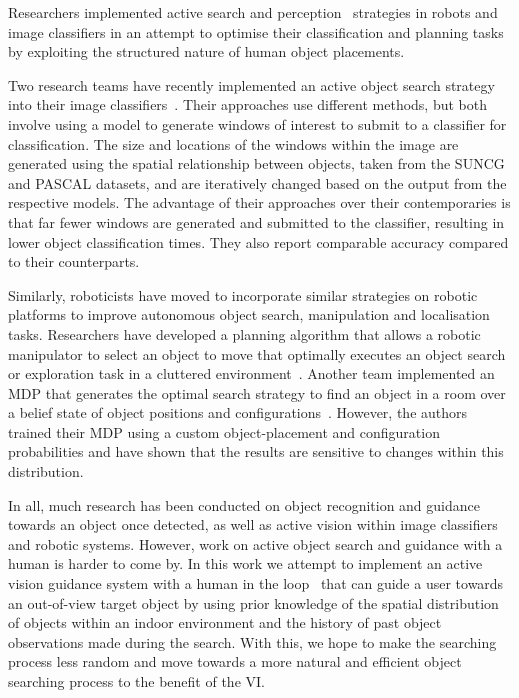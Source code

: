 \documentclass[a4paper, twoside]{article}
\begin{document}
Researchers implemented active search and perception~\cite{Bajcsy2017} strategies in robots and image classifiers in an attempt to optimise their classification and planning tasks by exploiting the structured nature of human object placements. 

Two research teams have recently implemented an active object search strategy into their image classifiers~\cite{caicedo2015active,gonzalez2015active}. Their approaches use different methods, but both involve using a model to generate windows of interest to submit to a classifier for classification. The size and locations of the windows within the image are generated using the spatial relationship between objects, taken from the SUNCG and PASCAL datasets, and are iteratively changed based on the output from the respective models. The advantage of their approaches over their contemporaries is that far fewer windows are generated and submitted to the classifier, resulting in lower object classification times. They also report comparable accuracy compared to their counterparts. 

Similarly, roboticists have moved to incorporate similar strategies on robotic platforms to improve autonomous object search, manipulation and localisation tasks. Researchers have developed a planning algorithm that allows a robotic manipulator to select an object to move that optimally executes an object search or exploration task in a cluttered environment~\cite{dogar2014object}. Another team implemented an MDP that generates the optimal search strategy to find an object in a room over a belief state of object positions and configurations~\cite{aydemir2011search}. However, the authors trained their MDP using a custom object-placement and configuration probabilities and have shown that the results are sensitive to changes within this distribution. 

In all, much research has been conducted on object recognition and guidance towards an object once detected, as well as active vision within image classifiers and robotic systems. However, work on active object search and guidance with a human is harder to come by. In this work we attempt to implement an active vision guidance system with a human in the loop~\cite{bellotto2013,lock2017portable} that can guide a user towards an out-of-view target object by using prior knowledge of the spatial distribution of objects within an indoor environment and the history of past object observations made during the search. With this, we hope to make the searching process less random and move towards a more natural and efficient object searching process to the benefit of the VI\@.  
\end{document}
